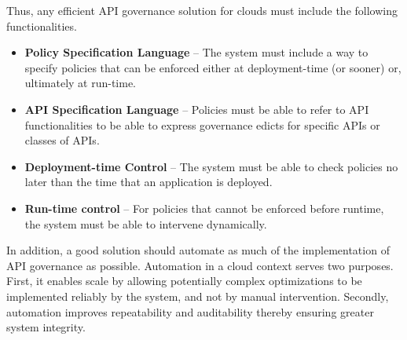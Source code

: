 Thus, any efficient API governance solution for clouds must include the
following functionalities.
\begin{itemize}
\item {\bf Policy Specification Language} -- The system must include a way to
specify policies that can be enforced either at deployment-time (or sooner)
or, ultimately at run-time.  
\item {\bf API Specification Language} -- Policies must be able to refer to
API functionalities to be able to express governance edicts for specific APIs
or classes of APIs.
\item {\bf Deployment-time Control} --  The system must be able to check policies
no later than the time that an application is deployed.
\item {\bf Run-time control} -- For policies that cannot be enforced before
runtime, the system must be able to intervene dynamically.
\end{itemize}
In addition, a good solution should automate 
as much of the implementation
of API governance as possible.  Automation in a cloud context serves two
purposes.  First, it enables scale by allowing potentially complex
optimizations to be implemented reliably by the system, and not by manual
intervention.  Secondly, automation improves repeatability and auditability
thereby ensuring greater system integrity.